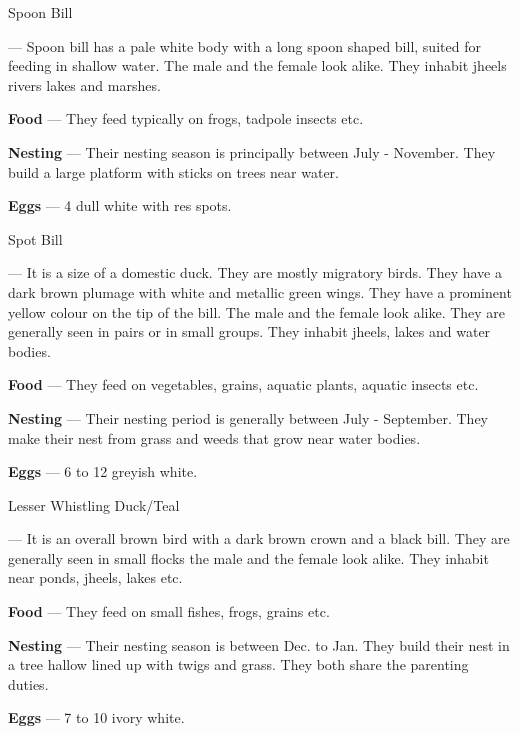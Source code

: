 \begin{bird}{Spoon Bill}

 --- Spoon bill has a pale white body with a long spoon shaped bill, suited for feeding in shallow water. The male and the female look alike. They inhabit jheels rivers lakes and marshes. 

{\large\bf Food} --- They feed typically on frogs, tadpole insects etc.

{\large\bf Nesting} --- Their nesting season is principally between July - November. They build a large platform with sticks on trees near water. 

{\large\bf Eggs} --- 4 dull white with res spots.
\end{bird}

\begin{bird}{Spot Bill}

 --- It is a size of a domestic duck. They are mostly migratory birds. They have a dark brown plumage with white and metallic green wings. They have a prominent yellow colour on the tip of the bill. The male and the female look alike. They are generally seen in pairs or in small groups. They inhabit jheels, lakes and water bodies.

{\large\bf Food} --- They feed on vegetables, grains, aquatic plants, aquatic insects etc.

{\large\bf Nesting} --- Their nesting period is generally between July - September. They make their nest from grass and weeds that grow near water bodies. 

{\large\bf Eggs} --- 6 to 12 greyish white.
\end{bird}

\begin{bird}{Lesser Whistling Duck/Teal}

 --- It is an overall brown bird with a dark brown crown and a black bill. They are generally seen in small flocks the male and the female look alike. They inhabit near ponds, jheels, lakes etc. 

{\large\bf Food} --- They feed on small fishes, frogs, grains etc.

{\large\bf Nesting} --- Their nesting season is between Dec. to Jan. They build their nest in a tree hallow lined up with twigs and grass. They both share the parenting duties.

{\large\bf Eggs} --- 7 to 10 ivory white.
\end{bird}

